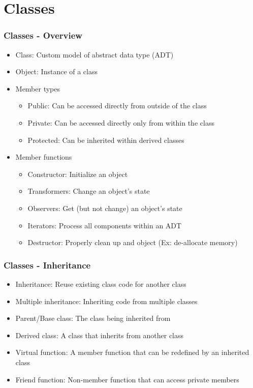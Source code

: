 \documentclass[c, aspectratio=169]{beamer}
\begin{document}
\section{Classes}
\begin{frame}\frametitle{Classes - Overview}
\begin{itemize}
\item Class: Custom model of abstract data type (ADT)
\item Object: Instance of a class
\item Member types
	\begin{itemize}
	\item Public: Can be accessed directly from outside of the class
	\item Private: Can be accessed directly only from within the class
	\item Protected: Can be inherited within derived classes
	\end{itemize}
\item Member functions
	\begin{itemize}
	\item Constructor: Initialize an object
	\item Transformers: Change an object's state
	\item Observers: Get (but not change) an object's state
	\item Iterators: Process all components within an ADT
	\item Destructor: Properly clean up and object (Ex: de-allocate memory)
	\end{itemize}
\end{itemize}
\end{frame}

\begin{frame}\frametitle{Classes - Inheritance}
\begin{itemize}
\item Inheritance: Reuse existing class code for another class
\item Multiple inheritance: Inheriting code from multiple classes
\item Parent/Base class: The class being inherited from
\item Derived class: A class that inherits from another class
\item Virtual function: A member function that can be redefined by an inherited class
\item Friend function: Non-member function that can access private members
\end{itemize}
\end{frame}
\end{document}
